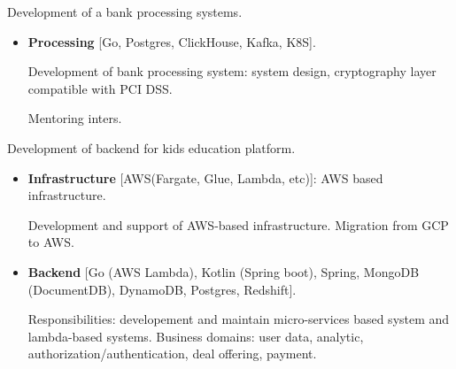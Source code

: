 \documentclass{cv}
\begin{document}
\begin{cvblock}{%
		}

	Development of a bank processing systems.

	\begin{itemize}
		\item \textbf{Processing} [Go, Postgres, ClickHouse, Kafka, K8S].

		      Development of bank processing system: system design,
		      cryptography layer compatible with PCI DSS.

		      Mentoring inters.

	\end{itemize}
\end{cvblock}

\begin{cvblock}{%
		}

	Development of backend for kids education platform.

	\begin{itemize}
		\item \textbf{Infrastructure} [AWS(Fargate, Glue, Lambda, etc)]: AWS based infrastructure.

		      Development and support of AWS-based infrastructure. Migration from GCP to AWS.

		\item \textbf{Backend} [Go (AWS Lambda), Kotlin (Spring boot), Spring, MongoDB (DocumentDB), DynamoDB, Postgres, Redshift].

		      Responsibilities: developement and maintain micro-services based system and lambda-based systems. Business domains:
		      user data, analytic, authorization/authentication, deal offering, payment.
	\end{itemize}
\end{cvblock}
\end{document}
